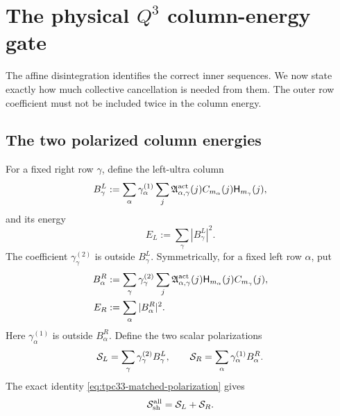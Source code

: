 \section{The physical \texorpdfstring{\(Q^3\)}{Q3} column-energy gate}
\label{sec:tpc33-column-transfer}

The affine disintegration identifies the correct inner sequences.  We now
state exactly how much collective cancellation is needed from them.  The
outer row coefficient must not be included twice in the column energy.

\subsection{The two polarized column energies}

For a fixed right row \(\gamma\), define the left-ultra column
\begin{equation}
 B_\gamma^L
 :=\sum_\alpha\gamma_\alpha^{(1)}
 \sum_j\mathfrak A_{\alpha,\gamma}^{\rm act}(j)
 C_{m_\alpha}(j)\mathsf H_{m_\gamma}(j),
 \label{eq:tpc33-left-column}
\end{equation}
and its energy
\begin{equation}
 E_L:=\sum_\gamma|B_\gamma^L|^2.
 \label{eq:tpc33-left-column-energy}
\end{equation}
The coefficient \(\gamma_\gamma^{(2)}\) is outside
\(B_\gamma^L\).  Symmetrically, for a fixed left row \(\alpha\), put
\begin{align}
 B_\alpha^R
 &:=\sum_\gamma\gamma_\gamma^{(2)}
 \sum_j\mathfrak A_{\alpha,\gamma}^{\rm act}(j)
 \mathsf H_{m_\alpha}(j)C_{m_\gamma}(j),
 \label{eq:tpc33-right-column}\\
 E_R&:=\sum_\alpha|B_\alpha^R|^2.
 \label{eq:tpc33-right-column-energy}
\end{align}
Here \(\gamma_\alpha^{(1)}\) is outside \(B_\alpha^R\).  Define the two
scalar polarizations
\begin{equation}
 \mathcal S_L=\sum_\gamma\gamma_\gamma^{(2)}B_\gamma^L,
 \qquad
 \mathcal S_R=\sum_\alpha\gamma_\alpha^{(1)}B_\alpha^R.
 \label{eq:tpc33-scalar-polarizations}
\end{equation}
The exact identity \eqref{eq:tpc33-matched-polarization} gives
\begin{equation}
 \mathcal S_{\rm sh}^{\rm all}=\mathcal S_L+\mathcal S_R.
 \label{eq:tpc33-shell-as-column-sum}
\end{equation}

